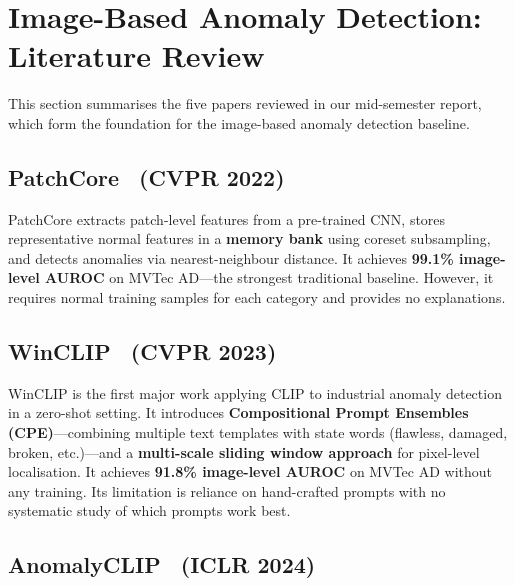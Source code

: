 
\section{Image-Based Anomaly Detection: Literature Review}
\label{sec:image_ad}

This section summarises the five papers reviewed in our mid-semester report, which form the foundation for the image-based anomaly detection baseline.

\subsection{PatchCore~\cite{roth2022patchcore} (CVPR 2022)}

PatchCore extracts patch-level features from a pre-trained CNN, stores representative normal features in a \textbf{memory bank} using coreset subsampling, and detects anomalies via nearest-neighbour distance. It achieves \textbf{99.1\% image-level AUROC} on MVTec AD---the strongest traditional baseline. However, it requires normal training samples for each category and provides no explanations.

\subsection{WinCLIP~\cite{jeong2023winclip} (CVPR 2023)}

WinCLIP is the first major work applying CLIP to industrial anomaly detection in a zero-shot setting. It introduces \textbf{Compositional Prompt Ensembles (CPE)}---combining multiple text templates with state words (flawless, damaged, broken, etc.)---and a \textbf{multi-scale sliding window approach} for pixel-level localisation. It achieves \textbf{91.8\% image-level AUROC} on MVTec AD without any training. Its limitation is reliance on hand-crafted prompts with no systematic study of which prompts work best.

\subsection{AnomalyCLIP~\cite{zhou2024anomalyclip} (ICLR 2024)}

